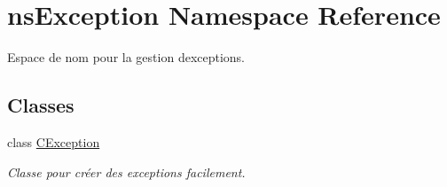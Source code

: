 \hypertarget{namespacens_exception}{}\section{ns\+Exception Namespace Reference}
\label{namespacens_exception}


Espace de nom pour la gestion d\textquotesingle{}exceptions.  


\subsection*{Classes}
\begin{DoxyCompactItemize}
\item 
class \hyperlink{classns_exception_1_1_c_exception}{C\+Exception}
\begin{DoxyCompactList}\small\item\em Classe pour créer des exceptions facilement. \end{DoxyCompactList}\end{DoxyCompactItemize}

